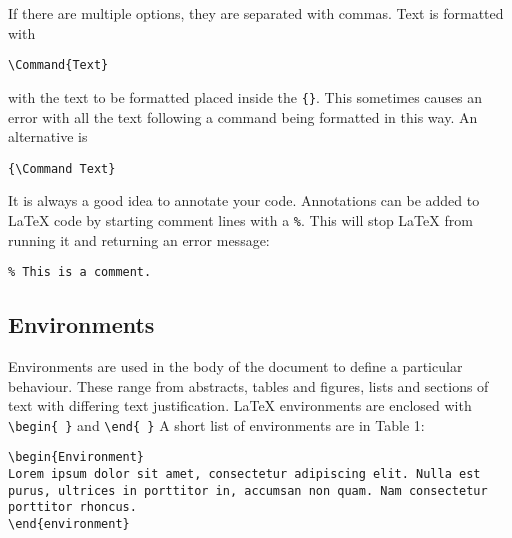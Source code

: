 \documentclass[a4paper]{article}
\begin{document}
If there are multiple options, they are separated with commas. Text is formatted with

\begin{verbatim}
\Command{Text}
\end{verbatim}

with the text to be formatted placed inside the \texttt{\{\}}. This sometimes causes an error with all the text following a command being formatted in this way. An alternative is

\begin{verbatim}
{\Command Text}
\end{verbatim}


It is always a good idea to annotate your code. Annotations can be added to LaTeX code by starting comment lines with a \texttt{\%}. This will stop LaTeX from running it and returning an error message:

\begin{verbatim}
% This is a comment.
\end{verbatim}


\subsection{Environments}

Environments are used in the body of the document to define a particular behaviour. These range from abstracts, tables and figures, lists and sections of text with differing text justification. LaTeX environments are enclosed with \texttt{\textbackslash begin\{ \}} and \texttt{\textbackslash end\{ \}} A short list of environments are in Table 1:

\begin{verbatim}
\begin{Environment}
Lorem ipsum dolor sit amet, consectetur adipiscing elit. Nulla est 
purus, ultrices in porttitor in, accumsan non quam. Nam consectetur 
porttitor rhoncus.
\end{environment}
\end{verbatim}
\end{document}
